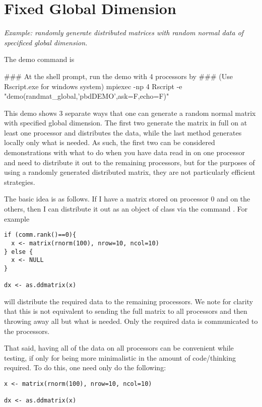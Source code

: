\section{Fixed Global Dimension}\label{subsec:rng.gl}

\emph{Example:  randomly generate distributed matrices with random normal data of specificed global dimension.}

The demo command is
\begin{Command}
### At the shell prompt, run the demo with 4 processors by
### (Use Rscript.exe for windows system)
mpiexec -np 4 Rscript -e "demo(randmat_global,'pbdDEMO',ask=F,echo=F)"
\end{Command}

This demo shows 3 separate ways that one can generate a random normal matrix with specified global dimension.  The first two generate the matrix in full on at least one processor and distributes the data, while the last method generates locally only what is needed.  As such, the first two can be considered demonstrations with what to do when you have data read in on one processor and need to distribute it out to the remaining processors, but for the purposes of using a randomly generated distributed matrix, they are not particularly efficient strategies.

The basic idea is as follows.  If I have a matrix  stored on processor 0 and  on the others, then I can distribute it out as an object of class  via the command .  For example
\begin{lstlisting}[language=rr]
if (comm.rank()==0){
  x <- matrix(rnorm(100), nrow=10, ncol=10)
} else {
  x <- NULL
}

dx <- as.ddmatrix(x)
\end{lstlisting}

will distribute the required data to the remaining processors.  We note for clarity that this is not equivalent to sending the full matrix to all processors and then throwing away all but what is needed.  Only the required data is communicated to the processors.

That said, having all of the data on all processors can be convenient while testing, if only for being more minimalistic in the amount of code/thinking required.  To do this, one need only do the following:

\begin{lstlisting}[language=rr]
x <- matrix(rnorm(100), nrow=10, ncol=10)

dx <- as.ddmatrix(x)
\end{lstlisting}

